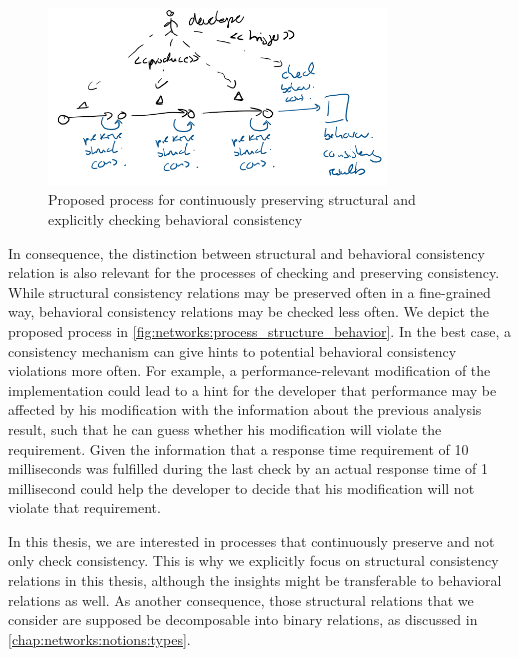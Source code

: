 \begin{figure}
    \centering
    \includegraphics[width=0.8\textwidth]{figures/prologue/networks/process_structure_behavior.png}
    \caption[Process for preserving structural and behavioral consistency]{Proposed process for continuously preserving structural and explicitly checking behavioral consistency}
    \label{fig:networks:process_structure_behavior}
\end{figure}

In consequence, the distinction between structural and behavioral consistency relation is also relevant for the processes of checking and preserving consistency.
While structural consistency relations may be preserved often in a fine-grained way, behavioral consistency relations may be checked less often.
We depict the proposed process in \autoref{fig:networks:process_structure_behavior}.
In the best case, a consistency mechanism can give hints to potential behavioral consistency violations more often.
For example, a performance-relevant modification of the implementation could lead to a hint for the developer that performance may be affected by his modification with the information about the previous analysis result, such that he can guess whether his modification will violate the requirement.
Given the information that a response time requirement of 10 milliseconds was fulfilled during the last check by an actual response time of 1 millisecond could help the developer to decide that his modification will not violate that requirement.

In this thesis, we are interested in processes that continuously preserve and not only check consistency.
This is why we explicitly focus on structural consistency relations in this thesis, although the insights might be transferable to behavioral relations as well.
As another consequence, those structural relations that we consider are supposed be decomposable into binary relations, as discussed in \autoref{chap:networks:notions:types}.



